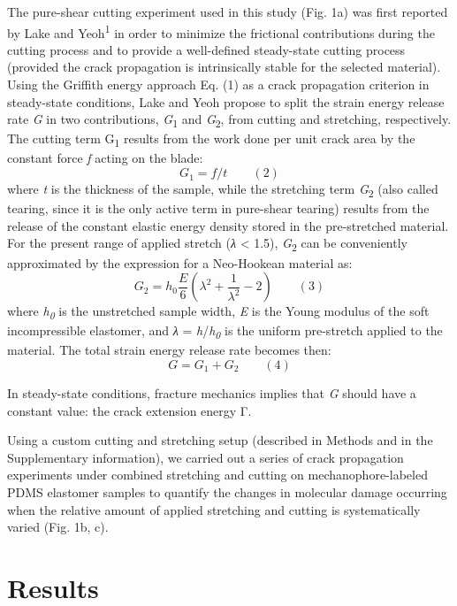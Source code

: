\documentclass{article}
\begin{document}
The pure-shear cutting experiment used in this study (Fig. 1a) was first reported by Lake and Yeoh\textsuperscript{1} in order to minimize the frictional contributions during the cutting process and to provide a well-defined steady-state cutting process (provided the crack propagation is intrinsically stable for the selected material). Using the Griffith energy approach Eq. (1) as a crack propagation criterion in steady-state conditions, Lake and Yeoh propose to split the strain energy release rate \emph{G} in two contributions, \emph{G}\textsubscript{1} and \emph{G}\textsubscript{2}, from cutting and stretching, respectively. The cutting term G\textsubscript{1} results from the work done per unit crack area by the constant force \emph{f} acting on the blade:
\[ G_1 = f/t \qquad (2) \]
where \emph{t} is the thickness of the sample, while the stretching term \emph{G}\textsubscript{2} (also called tearing, since it is the only active term in pure-shear tearing) results from the release of the constant elastic energy density stored in the pre-stretched material. For the present range of applied stretch (\emph{λ} < 1.5), \emph{G}\textsubscript{2} can be conveniently approximated by the expression for a Neo-Hookean material as:
\[ G_2 = h_0 \frac{E}{6}\left(\lambda^2 + \frac{1}{\lambda^2} - 2\right) \qquad (3) \]
where \emph{h}\textsubscript{\emph{0}} is the unstretched sample width, \emph{E} is the Young modulus of the soft incompressible elastomer, and \emph{λ} = \emph{h}/\emph{h}\textsubscript{\emph{0}} is the uniform pre-stretch applied to the material. The total strain energy release rate becomes then:
\[ G = G_1 + G_2 \qquad (4) \]

In steady-state conditions, fracture mechanics implies that \emph{G} should have a constant value: the crack extension energy Γ.

Using a custom cutting and stretching setup (described in Methods and in the Supplementary information), we carried out a series of crack propagation experiments under combined stretching and cutting on mechanophore-labeled PDMS elastomer samples to quantify the changes in molecular damage occurring when the relative amount of applied stretching and cutting is systematically varied (Fig. 1b, c).

\section*{Results}
\end{document}
